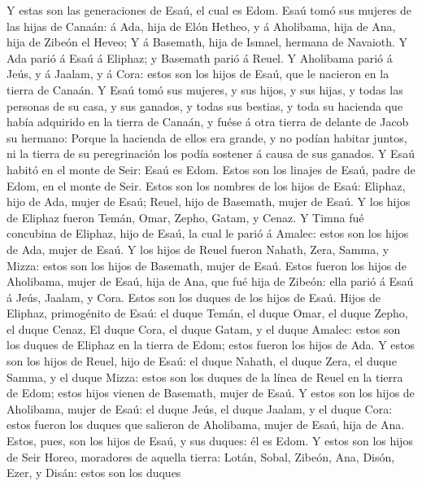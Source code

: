 Y estas son las generaciones de Esaú, el cual es Edom.
 Esaú tomó sus mujeres de las hijas de Canaán: á Ada, hija
de Elón Hetheo, y á Aholibama, hija de Ana, hija de Zibeón el Heveo;
 Y á Basemath, hija de Ismael, hermana de Navaioth.
 Y Ada parió á Esaú á Eliphaz; y Basemath parió á Reuel.
 Y Aholibama parió á Jeús, y á Jaalam, y á Cora: estos son
los hijos de Esaú, que le nacieron en la tierra de Canaán.
 Y Esaú tomó sus mujeres, y sus hijos, y sus hijas, y
todas las personas de su casa, y sus ganados, y todas sus bestias, y
toda su hacienda que había adquirido en la tierra de Canaán, y fuése á
otra tierra de delante de Jacob su hermano:  Porque la
hacienda de ellos era grande, y no podían habitar juntos, ni la tierra
de su peregrinación los podía sostener á causa de sus ganados.
 Y Esaú habitó en el monte de Seir: Esaú es Edom.
 Estos son los linajes de Esaú, padre de Edom, en el monte
de Seir.  Estos son los nombres de los hijos de Esaú:
Eliphaz, hijo de Ada, mujer de Esaú; Reuel, hijo de Basemath, mujer de
Esaú.  Y los hijos de Eliphaz fueron Temán, Omar, Zepho,
Gatam, y Cenaz.  Y Timna fué concubina de Eliphaz, hijo
de Esaú, la cual le parió á Amalec: estos son los hijos de Ada, mujer de
Esaú.  Y los hijos de Reuel fueron Nahath, Zera, Samma, y
Mizza: estos son los hijos de Basemath, mujer de Esaú. 
Estos fueron los hijos de Aholibama, mujer de Esaú, hija de Ana, que fué
hija de Zibeón: ella parió á Esaú á Jeús, Jaalam, y Cora.
 Estos son los duques de los hijos de Esaú. Hijos de
Eliphaz, primogénito de Esaú: el duque Temán, el duque Omar, el duque
Zepho, el duque Cenaz,  El duque Cora, el duque Gatam, y
el duque Amalec: estos son los duques de Eliphaz en la tierra de Edom;
estos fueron los hijos de Ada.  Y estos son los hijos de
Reuel, hijo de Esaú: el duque Nahath, el duque Zera, el duque Samma, y
el duque Mizza: estos son los duques de la línea de Reuel en la tierra
de Edom; estos hijos vienen de Basemath, mujer de Esaú. 
Y estos son los hijos de Aholibama, mujer de Esaú: el duque Jeús, el
duque Jaalam, y el duque Cora: estos fueron los duques que salieron de
Aholibama, mujer de Esaú, hija de Ana.  Estos, pues, son
los hijos de Esaú, y sus duques: él es Edom.  Y estos son
los hijos de Seir Horeo, moradores de aquella tierra: Lotán, Sobal,
Zibeón, Ana,  Disón, Ezer, y Disán: estos son los duques
